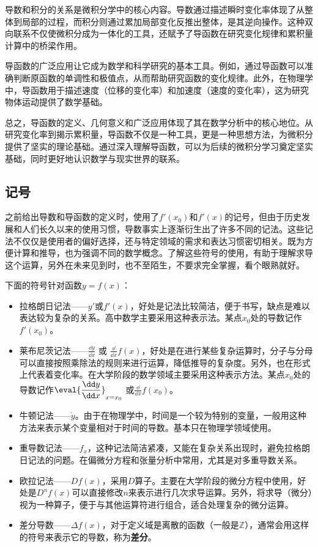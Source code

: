 导数和积分的关系是微积分学中的核心内容。导数通过描述瞬时变化率体现了从整体到局部的过程，而积分则通过累加局部变化反推出整体，是其逆向操作。这种双向联系不仅使微积分成为一体化的工具，还赋予了导函数在研究变化规律和累积量计算中的桥梁作用。

导函数的广泛应用让它成为数学和科学研究的基本工具。例如，通过导函数可以准确判断原函数的单调性和极值点，从而帮助研究函数的变化规律。此外，在物理学中，导函数用于描述速度（位移的变化率）和加速度（速度的变化率），这为研究物体运动提供了数学基础。

总之，导函数的定义、几何意义和广泛应用体现了其在数学分析中的核心地位。从研究变化率到揭示累积量，导函数不仅是一种工具，更是一种思想方法，为微积分提供了坚实的理论基础。通过深入理解导函数，可以为后续的微积分学习奠定坚实基础，同时更好地认识数学与现实世界的联系。


\subsection{记号}

之前给出导数和导函数的定义时，使用了$f'(x_0)$和$f'(x)$的记号，但由于历史发展和人们长久以来的使用习惯，导数事实上逐渐衍生出了许多不同的记法。这些记法不仅仅是使用者的偏好选择，还与特定领域的需求和表达习惯密切相关。既为方便计算和推导，也为强调不同的数学概念。了解这些符号的使用，有助于理解求导这个运算，另外在未来见到时，也不至陌生，不要求完全掌握，看个眼熟就好。

下面的符号针对函数$y=f(x)$：
\begin{itemize}
\item 拉格朗日记法——$y'$或$f'(x)$，好处是记法比较简洁，便于书写，缺点是难以表达较为复杂的关系。高中数学主要采用这种表示法。某点$x_0$处的导数记作$f'(x_0)$。
\item 莱布尼茨记法——$\displaystyle\frac{\dd y}{\dd x}$  或  $\displaystyle\frac{\dd}{\dd x}f(x)$，好处是在进行某些复杂运算时，分子与分母可以直接按照乘除法的规则来进行运算，降低推导的复杂度。另外，也在形式上代表着变化率。在大学阶段的数学领域主要采用这种表示方法。某点$x_0$处的导数记作$\displaystyle\eval{\dfrac{\dd y}{\dd x}}_{x=x_0}$ 或$\displaystyle\frac{\dd}{\dd x}f(x_0)$。
\item 牛顿记法——$\dot{y}$。由于在物理学中，时间是一个较为特别的变量，一般用这种方法来表示某个变量相对于时间的导数。基本只在物理学领域使用。
\item 重导数记法——$f_x$，这种记法简洁紧凑，又能在复杂关系出现时，避免拉格朗日记法的问题。在偏微分方程和张量分析中常用，尤其是对多重导数关系。
\item 欧拉记法——$Df(x)$，采用$D$算子。主要在大学阶段的微分方程中使用，好处是$D^n f(x)$可以直接修改$n$来表示进行几次求导运算。另外，将求导（微分）视为一种算子，便于与其他运算符进行组合，适合处理复杂的微分运算。
\item 差分导数——$\Delta f(x)$，对于定义域是离散的函数（一般是$\mathbb{Z}$），通常会用这样的符号来表示它的导数，称为\textbf{差分}。
\end{itemize}

